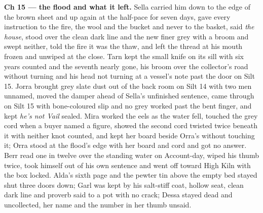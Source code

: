 \documentclass{design/chronicle}
\begin{document}
{\textbf{Ch 15 — the flood and what it left.} Sella carried him down to the edge of the brown sheet and up again at the half-pace for seven days, gave every instruction to the fire, the wool and the bucket and never to the basket, said \emph{the house}, stood over the clean dark line and the new finer grey with a broom and swept neither, told the fire it was the thaw, and left the thread at his mouth frozen and unwiped at the close. Tarn kept the small knife on its sill with six years counted and the seventh nearly gone, his broom over the collector’s road without turning and his head not turning at a vessel’s note past the door on Silt 15. Jorra brought grey slate dust out of the back room on Silt 14 with two men unnamed, moved the damper ahead of Sella’s unfinished sentence, came through on Silt 15 with bone-coloured slip and no grey worked past the bent finger, and kept \emph{he’s not Vail} sealed. Mira worked the eels as the water fell, touched the grey cord when a buyer named a figure, showed the second cord twisted twice beneath it with neither knot counted, and kept her board beside Orra’s without touching it; Orra stood at the flood’s edge with her board and cord and got no answer. Berr read one in twelve over the standing water on Account-day, wiped his thumb twice, took himself out of his own sentence and went off toward High Kiln with the box locked. Alda’s sixth page and the pewter tin above the empty bed stayed shut three doors down; Garl was kept by his salt-stiff coat, hollow seat, clean dark line and proverb said to a pot with no crack; Dessa stayed dead and uncollected, her name and the number in her thumb unsaid.

}
\end{document}
